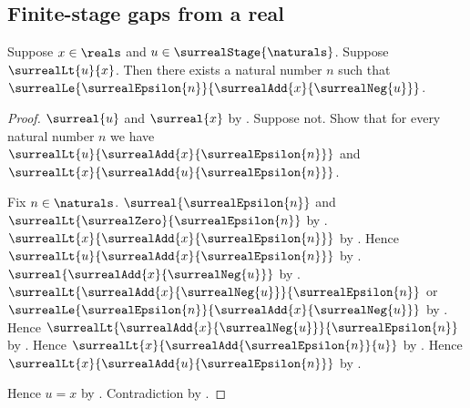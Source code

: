 \subsection{Finite-stage gaps from a real}

\begin{lemma}\label{real_lower_epsilon_gap}
    Suppose $x\in\reals$ and $u\in\surrealStage{\naturals}$.
    Suppose $\surrealLt{u}{x}$.
    Then there exists a natural number $n$ such that
        $\surrealLe{\surrealEpsilon{n}}
            {\surrealAdd{x}{\surrealNeg{u}}}$.
\end{lemma}
\begin{proof}
    $\surreal{u}$ and $\surreal{x}$
        by
        .
    Suppose not.
    Show that for every natural number $n$ we have
        $\surrealLt{u}{\surrealAdd{x}{\surrealEpsilon{n}}}$ and
        $\surrealLt{x}{\surrealAdd{u}{\surrealEpsilon{n}}}$.
    \begin{subproof}
        Fix $n\in\naturals$.
        $\surreal{\surrealEpsilon{n}}$ and
            $\surrealLt{\surrealZero}{\surrealEpsilon{n}}$
            by
            .
        $\surrealLt{x}{\surrealAdd{x}{\surrealEpsilon{n}}}$
            by
            .
        Hence $\surrealLt{u}{\surrealAdd{x}{\surrealEpsilon{n}}}$
            by
            .
        $\surreal{\surrealAdd{x}{\surrealNeg{u}}}$
            by
            .
        $\surrealLt
            {\surrealAdd{x}{\surrealNeg{u}}}
            {\surrealEpsilon{n}}$ or
            $\surrealLe
                {\surrealEpsilon{n}}
                {\surrealAdd{x}{\surrealNeg{u}}}$
            by .
        Hence
            $\surrealLt
                {\surrealAdd{x}{\surrealNeg{u}}}
                {\surrealEpsilon{n}}$
            by \auto.
        Hence $\surrealLt{x}{\surrealAdd{\surrealEpsilon{n}}{u}}$
            by .
        Hence $\surrealLt{x}{\surrealAdd{u}{\surrealEpsilon{n}}}$
            by .
    \end{subproof}
    Hence $u=x$ by .
    Contradiction by .
\end{proof}

